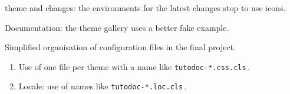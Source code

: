 \documentclass{tutodoc}
\begin{document}
\begin{tdocupdate}
	\item {} theme and changes: the environments for the latest changes stop to use icons.

	\item Documentation: the theme gallery uses a better fake example.
\end{tdocupdate}



\begin{tdoctech}
	\item Simplified organisation of configuration files in the final project.
	\begin{enumerate}
		\item Use of one file per theme with a name like \texttt{tutodoc-*.css.cls}\,.

		\item Locale: use of names like \texttt{tutodoc-*.loc.cls}\,.
	\end{enumerate}
\end{tdoctech}
\end{document}
